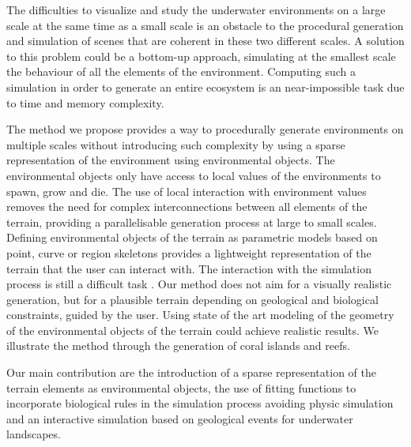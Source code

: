 The difficulties to visualize and study the underwater environments on a large scale at the same time as a small scale is an obstacle to the procedural generation and simulation of scenes that are coherent in these two different scales. 
A solution to this problem could be a bottom-up approach, simulating at the smallest scale the behaviour of all the elements of the environment. Computing such a simulation in order to generate an entire ecosystem is an near-impossible task due to time and memory complexity. 

The method we propose provides a way to procedurally generate environments on multiple scales without introducing such complexity by using a sparse representation of the environment using environmental objects.
The environmental objects only have access to local values of the environments to spawn, grow and die. The use of local interaction with environment values removes the need for complex interconnections between all elements of the terrain, providing a parallelisable generation process at large to small scales.
Defining environmental objects of the terrain as parametric models based on point, curve or region skeletons provides a lightweight representation of the terrain that the user can interact with. The interaction with the simulation process is still a difficult task \cite{Smelik2014}.
Our method does not aim for a visually realistic generation, but for a plausible terrain depending on geological and biological constraints, guided by the user. Using state of the art modeling of the geometry of the environmental objects of the terrain could achieve realistic results. We illustrate the method through the generation of coral islands and reefs.

Our main contribution are the introduction of a sparse representation of the terrain elements as environmental objects, the use of fitting functions to incorporate biological rules in the simulation process avoiding physic simulation and an interactive simulation based on geological events for underwater landscapes.


